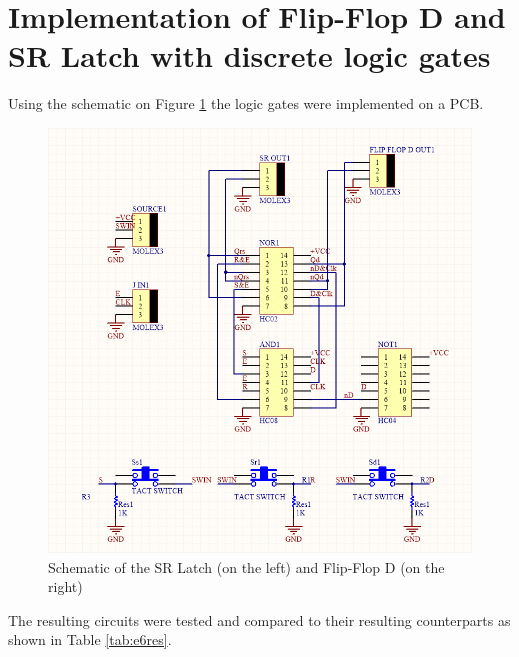 \documentclass{article}
\begin{document}
        \section{Implementation of Flip-Flop D and SR Latch with discrete logic gates}
        Using the schematic on Figure \ref{fig:Schem} the logic gates were implemented on a PCB.
        
        \begin{figure}[h]
            \begin{center}
                \includegraphics[width=\linewidth]{e6Schem.png}
                \caption{Schematic of the  SR Latch (on the left) and Flip-Flop D (on the right)}
            \end{center}
            \label{fig:Schem}
        \end{figure}

        The resulting circuits were tested and compared to their resulting counterparts as shown in Table \ref{tab:e6res}.
        \begin{table}
            \begin{center}
                
            \end{center}
            \label{tab:e6res}
        \end{table}
            


    
\end{document}
